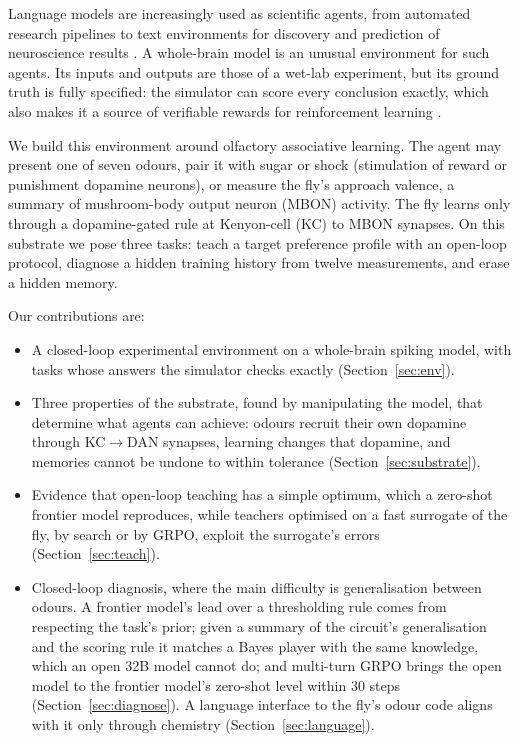 \documentclass{article}
\begin{document}
Language models are increasingly used as scientific agents, from automated research pipelines \citep{lu2024aiscientist} to text environments for discovery \citep{wang2022scienceworld,jansen2024discoveryworld} and prediction of neuroscience results \citep{luo2025brainbench}. A whole-brain model is an unusual environment for such agents. Its inputs and outputs are those of a wet-lab experiment, but its ground truth is fully specified: the simulator can score every conclusion exactly, which also makes it a source of verifiable rewards for reinforcement learning \citep{shao2024,deepseekr1}.

We build this environment around olfactory associative learning. The agent may present one of seven odours, pair it with sugar or shock (stimulation of reward or punishment dopamine neurons), or measure the fly's approach valence, a summary of mushroom-body output neuron (MBON) activity. The fly learns only through a dopamine-gated rule at Kenyon-cell (KC) to MBON synapses. On this substrate we pose three tasks: teach a target preference profile with an open-loop protocol, diagnose a hidden training history from twelve measurements, and erase a hidden memory.

Our contributions are:
\begin{itemize}
\item A closed-loop experimental environment on a whole-brain spiking model, with tasks whose answers the simulator checks exactly (Section~\ref{sec:env}).
\item Three properties of the substrate, found by manipulating the model, that determine what agents can achieve: odours recruit their own dopamine through KC$\rightarrow$DAN synapses, learning changes that dopamine, and memories cannot be undone to within tolerance (Section~\ref{sec:substrate}).
\item Evidence that open-loop teaching has a simple optimum, which a zero-shot frontier model reproduces, while teachers optimised on a fast surrogate of the fly, by search or by GRPO, exploit the surrogate's errors (Section~\ref{sec:teach}).
\item Closed-loop diagnosis, where the main difficulty is generalisation between odours. A frontier model's lead over a thresholding rule comes from respecting the task's prior; given a summary of the circuit's generalisation and the scoring rule it matches a Bayes player with the same knowledge, which an open 32B model cannot do; and multi-turn GRPO brings the open model to the frontier model's zero-shot level within 30 steps (Section~\ref{sec:diagnose}). A language interface to the fly's odour code aligns with it only through chemistry (Section~\ref{sec:language}).
\end{itemize}
\end{document}
